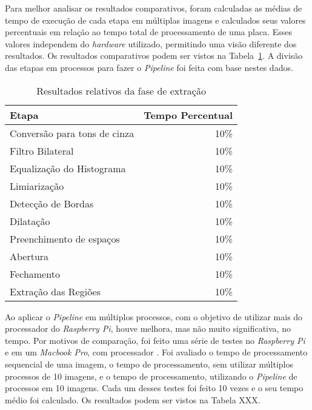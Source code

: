 Para melhor analisar os resultados comparativos, foram calculadas as médias de
tempo de execução de cada etapa em múltiplas imagens e calculados seus valores
percentuais em relação ao tempo total de processamento de uma placa. Esses
valores independem do \emph{hardware} utilizado, permitindo uma visão diferente dos resultados. 
Os resultados comparativos podem ser vistos na Tabela~\ref{tab:resultados_relativos}. A divisão
das etapas em processos para fazer o \emph{Pipeline} foi feita com base nestes dados.

\begin{table}[H]
\centering
\caption{Resultados relativos da fase de extração}
\label{tab:resultados_relativos}
\begin{tabular}{@{}lr@{}}
\toprule
Etapa                        & Tempo Percentual \\ \midrule
Conversão para tons de cinza & 10\%             \\
Filtro Bilateral             & 10\%             \\
Equalização do Histograma    & 10\%             \\
Limiarização                 & 10\%             \\
Detecção de Bordas           & 10\%             \\
Dilatação                    & 10\%             \\
Preenchimento de espaços     & 10\%             \\
Abertura                     & 10\%             \\
Fechamento                   & 10\%             \\
Extração das Regiões         & 10\%             \\ \bottomrule
\end{tabular}
\end{table}

Ao aplicar o \emph{Pipeline} em múltiplos processos, com o objetivo de
utilizar mais do processador do \emph{Raspberry Pi}, houve melhora, mas
não muito significativa, no tempo. Por motivos de comparação, foi feito
uma série de testes no \emph{Raspberry Pi} e em um 
\emph{Macbook Pro}, com processador \emph{}. Foi avaliado o tempo de processamento
sequencial de uma imagem, o tempo de processamento, sem utilizar múltiplos processos
de 10 imagens, e o tempo de processamento, utilizando o \emph{Pipeline} de processos
em 10 imagens. Cada um desses testes foi feito 10 vezes e o seu tempo médio foi calculado.
Os resultados podem ser vistos na Tabela XXX.


